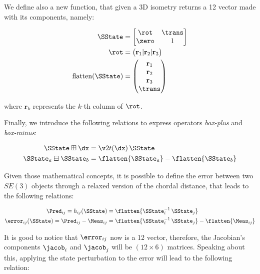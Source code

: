 We define also a new function, that given a 3D isometry returns a 12 vector made with its components, namely:

\begin{align}
    \SState &= 
        \begin{bmatrix}
            \rot & \trans \\ \zero & 1
        \end{bmatrix} \nonumber \\
    \rot &= \begin{pmatrix} \mathbf{r}_1 | \mathbf{r}_2 | \mathbf{r}_3 \end{pmatrix} \nonumber \\
    \text{flatten}(\SState) &= \begin{pmatrix} \mathbf{r}_1 \\ \mathbf{r}_2 \\ \mathbf{r}_3 \\ \trans \end{pmatrix}
    \label{eq:flatten_isometry_operator}
\end{align}

\noindent where $\mathbf{r}_k$ represents the $k$-th column of $\rot$.

Finally, we introduce the following relations to express operators \textit{box-plus} and \textit{box-minus}:

\begin{align}
    \label{eq:boxplus_se3}
    \SState \boxplus \dx &= \v2t(\dx)\, \SState \\
    \label{eq:boximus_se3}
    \SState_a \boxminus \SState_b &= \flatten{\SState_a} - \flatten{\SState_b}
\end{align}

Given those mathematical concepts, it is possible to define the error between two $SE(3)$ objects through a relaxed version of the chordal distance, that leads to the following relations:

\begin{align}
    \label{eq:prediction_se3}
    \Pred_{ij} = h_{ij}(\SState) &= \flatten{\SState_i^{-1}\,\SState_j} \\
    \label{eq:error_se3}
    \error_{ij}(\SState) = \Pred_{ij} - \Meas_{ij} &= \flatten{\SState_i^{-1}\, \SState_j} - \flatten{\Meas_{ij}}
\end{align}

\noindent It is good to notice that $\error_{ij}$ now is a 12 vector, therefore, the Jacobian's components $\jacob_i$ and $\jacob_j$ will be $(12\times6)$ matrices. Speaking about this, applying the state perturbation to the error will lead to the following relation:

